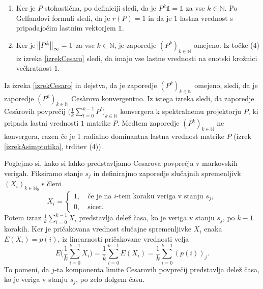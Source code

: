 \documentclass[mat1]{fmfdelo}
\newcommand{\N}{\mathbb N}
\begin{document}
\begin{dokaz}
    \leavevmode
    \begin{enumerate}
        \item Ker je $P$ stohastična, po definiciji sledi, da je $P^k \mathds{1} = \mathds{1}$ za vse $k \in \N$. Po Gelfandovi formuli sledi, da je $r(P) = 1$ in da je $1$ lastna vrednost s pripadajočim lastnim vektorjem $\mathds{1}$.
        \item Ker je $\norm{P^k}_\infty = 1$ za vse $k \in \N$, je zaporedje $(P^k)_{k\in\N}$ omejeno. Iz točke (4) iz izreka \ref{izrekCesaro} sledi, da imajo vse lastne vrednosti na enotski krožnici večkratnost $1$.
    \end{enumerate}
\end{dokaz}
Iz izreka \ref{izrekCesaro} in dejstva, da je zaporedje $(P^k)_{k\in\N}$ omejeno, sledi, da je zaporedje $(P^k)_{k\in\N}$ Ces\`arovo konvergentno. Iz istega izreka sledi, da zaporedje Ces\`arovih povprečij $\Big(\frac{1}{k} \sum_{l=0}^{k-1} P^l\Big)_{k\in\N}$ konvergera k spektralnemu projektorju $P$, ki pripada lastni vrednosti $1$ matrike $P$. Medtem zaporedje $(P^k)_{k\in\N}$ ne konvergera, razen če je $1$ radialno dominantna lastna vrednost matrike $P$ (izrek \ref{izrekAsimptotika}, trditev (4)).

Poglejmo si, kako si lahko predstavljamo Cesarova povprečja v markovskih verigah. Fiksiramo stanje $s_j$ in definirajmo zaporedje slučajnih spremenljivk $(X_i)_{k\in\N_0}$ s členi
\begin{equation*}
    X_i =
    \begin{cases}
        1, \quad \text{če je na $i$-tem koraku veriga v stanju $s_j$}, \\
        0, \quad \text{sicer}.
    \end{cases}
\end{equation*}
Potem izraz $\frac{1}{k} \sum_{i=0}^{k-1} X_i$ predstavlja delež časa, ko je veriga v stanju $s_j$, po $k-1$ korakih. Ker je pričakovana vrednost slučajne spremenljivke $X_i$ enaka $E(X_i) = p(i)$, iz linearnosti pričakovane vrednosti velja
\begin{equation*}
    E\Big(\frac{1}{k} \sum_{i=0}^{k-1} X_i\Big) = \frac{1}{k} \sum_{i=0}^{k-1} E(X_i) = \frac{1}{k} \sum_{i=0}^{k-1} \left(p(i)\right)_j.
\end{equation*}
To pomeni, da $j$-ta komponenta limite Cesarovih povprečij predstavlja delež časa, ko je veriga v stanju $s_j$, po zelo dolgem času.
\end{document}
